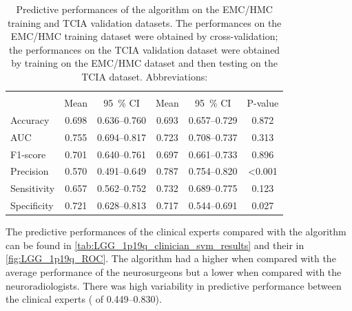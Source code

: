 \begin{table}[htbp]
    \begin{tabular}{L{2cm} S[table-format=1.3] S[table-format=2.7] S[table-format=1.3]  S[table-format=2.7] S[table-format=1.3, table-comparator = true]}
        \toprule
        &  &  \\
        \cmidrule(lr){2-3} \cmidrule(lr){4-5}
        & {Mean} & {\SI{95}{\percent} CI} & {Mean} & {\SI{95}{\percent} CI} & {P-value}\\
        \midrule
        Accuracy & 0.698 & \numrange{0.636}{0.760} & 0.693 & \numrange{0.657}{0.729} & 0.872\\
        \acrshort{AUC} & 0.755 & \numrange{0.694}{0.817} & 0.723 &\numrange{0.708}{0.737} & 0.313\\
        F1-score & 0.701 & \numrange{0.640}{0.761} & 0.697 & \numrange{0.661}{0.733} & 0.896\\
        Precision & 0.570 & \numrange{0.491}{0.649} & 0.787 & \numrange{0.754}{0.820} & <0.001\\
        Sensitivity & 0.657 & \numrange{0.562}{0.752} & 0.732 & \numrange{0.689}{0.775} & 0.123\\
        Specificity & 0.721 & \numrange{0.628}{0.813} & 0.717 & \numrange{0.544}{0.691} & 0.027\\
        \bottomrule
    \end{tabular}
    \caption{Predictive performances of the algorithm on the \acrshort{EMC}/\acrshort{HMC} training and \acrshort{TCIA} validation datasets. The performances on the \acrshort{EMC}/\acrshort{HMC} training dataset were obtained by cross-validation; the performances on the \acrshort{TCIA} validation dataset were obtained by training on the \acrshort{EMC}/\acrshort{HMC} dataset and then testing on the \acrshort{TCIA} dataset. Abbreviations: }\label{tab:LGG_1p19q_svm_results}
    \end{table}



The predictive performances of the clinical experts compared with the algorithm can be found in \cref{tab:LGG_1p19q_clinician_svm_results} and their  in \cref{fig:LGG_1p19q_ROC}.
The algorithm had a higher  when compared with the average performance of the neurosurgeons but a lower  when compared with the neuroradiologists.
There was high variability in predictive performance between the clinical experts ( of \numrange{0.449}{0.830}).

